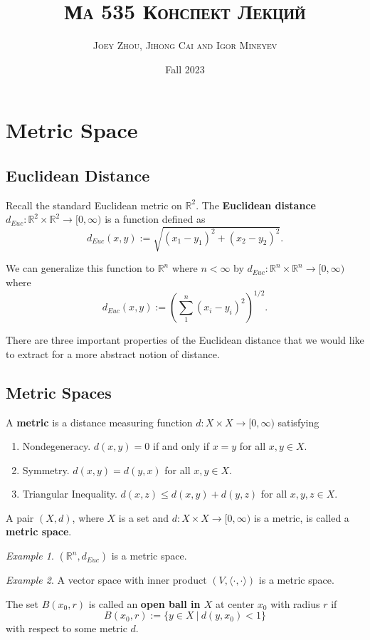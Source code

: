\documentclass[article,11pt, reqno]{article}
\title{\textbf{\textsc{Ма 535 Конспект Лекций}}}
\author{\textsc{Joey Zhou, Jihong Cai and Igor Mineyev}}
\date{Fall 2023}
\theoremstyle{remark}
\newtheorem*{example}{Example}
\newcommand{\tb}{\textbf}
\newcommand{\mb}{\mathbb}
\newcommand{\<}{\langle}
\renewcommand{\>}{\rangle}
\begin{document}
\maketitle
\tableofcontents
\section{Metric Space}
\subsection*{Euclidean Distance}
Recall the standard Euclidean metric on $\mb R^2$. The \tb{Euclidean distance} $d_{Euc}:\mb R^2\times \mb R^2\rightarrow [0,\infty)$ is a function defined as
$$d_{Euc}(x,y):=\sqrt{(x_1-y_1)^2+(x_2-y_2)^2}.$$

We can generalize this function to $\mb R^n$ where $n<\infty$ by $d_{Euc}:\mb R^n\times \mb R^n\rightarrow [0,\infty)$ where
$$d_{Euc}(x,y):=(\sum_1^n (x_i-y_i)^2)^{1/2}.$$

There are three important properties of the Euclidean distance that we would like to extract for a more abstract notion of distance.

\subsection*{Metric Spaces}
A \tb{metric} is a distance measuring function $d: X\times X\rightarrow [0,\infty)$ satisfying
\begin{enumerate}
    \item Nondegeneracy. $d(x,y)=0$ if and only if $x=y$ for all $x,y\in X$.
    \item Symmetry. $d(x,y)=d(y,x)$ for all $x,y\in X$.
    \item Triangular Inequality. $d(x,z)\leq d(x,y)+d(y,z)$ for all $x,y, z\in X$.
\end{enumerate}
A pair $(X,d)$, where $X$ is a set and $d:X\times X\rightarrow [0,\infty)$ is a metric, is called a \tb{metric space}.

\begin{example}
    $(\mb R^n, d_{Euc})$ is a metric space.
\end{example}
\begin{example}
    A vector space with inner product $(V, \langle\cdot,\cdot\rangle)$ is a metric space.
\end{example}

The set $B(x_0,r)$ is called an \tb{open ball in $X$} at center $x_0$ with radius $r$ if
$$B(x_0,r):=\{y\in X\ |\ d(y, x_0)<1\}$$
with respect to some metric $d$.
\end{document}
